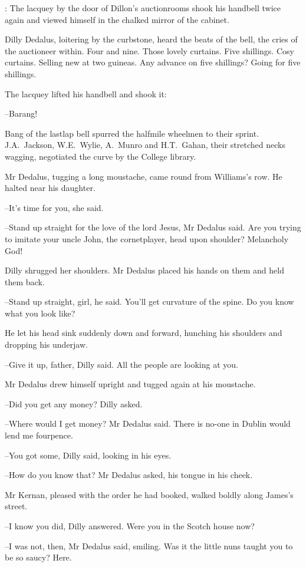 :
The lacquey by the door of Dillon's auctionrooms
shook his handbell
twice again
and viewed himself in the chalked mirror of the cabinet.

Dilly Dedalus, loitering by the curbstone,
heard the beats of the bell,
the cries of the auctioneer within.
Four and nine.
Those lovely curtains.
Five shillings.
Cosy curtains.
Selling new at two guineas.
Any advance on
five shillings?
Going for five shillings.

The lacquey lifted his handbell and shook it:

--Barang!%

Bang of the lastlap bell
spurred the halfmile wheelmen to their sprint.
J.A.~Jackson,
W.E.~Wylie,
A.~Munro
and H.T.~Gahan,
their stretched
necks wagging,
negotiated the curve by the College library.

Mr Dedalus,
tugging a long moustache,
came round from Williams's
row.
He halted near his daughter.

--It's time for you,
she said.

--Stand up straight for the love of the lord Jesus,
Mr Dedalus said.
Are
you trying to imitate your uncle John, the cornetplayer,
head upon
shoulder?
Melancholy God!

Dilly shrugged her shoulders.
Mr Dedalus placed his hands on them
and held them back.

--Stand up straight, girl,
he said.
You'll get curvature of the spine.
Do you know what you look like?

He let his head sink suddenly down and forward,
hunching his
shoulders and dropping his underjaw.

--Give it up, father,
Dilly said.
All the people are looking at you.

Mr Dedalus drew himself upright
and tugged again at his moustache.

--Did you get any money?
Dilly asked.

--Where would I get money?
Mr Dedalus said.
There is no-one in Dublin would lend me fourpence.%

--You got some,
Dilly said,
looking in his eyes.

--How do you know that?
Mr Dedalus asked,
his tongue in his cheek.

Mr Kernan,
pleased with the order he had booked,
walked boldly
along James's street.

--I know you did,
Dilly answered.
Were you in the Scotch house now?

--I was not, then,
Mr Dedalus said, smiling.
Was it the little nuns
taught you to be so saucy?
Here.

